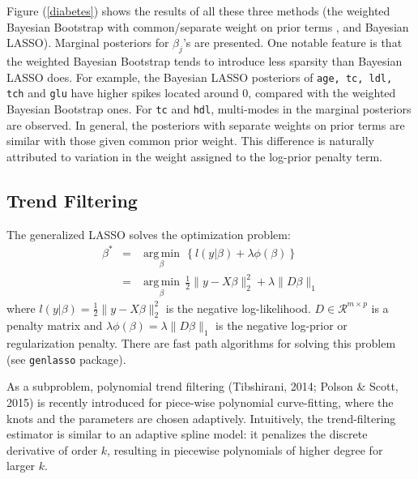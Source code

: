 \documentclass[12pt]{TD-CJS}
\newcommand{\R}{\mathcal{R}}
\DeclareMathOperator*{\argmin}{arg\,min}
\begin{document}
Figure (\ref{diabetes}) shows the results of all these three methods (the weighted Bayesian Bootstrap with common/separate  weight on prior terms , and Bayesian LASSO). Marginal posteriors for $\beta_j$'s are presented. One notable feature is that the weighted Bayesian Bootstrap tends to introduce less sparsity than Bayesian LASSO does. For example, the Bayesian LASSO posteriors of {\tt age, tc, ldl, tch} and {\tt glu} have higher spikes located around 0, compared with the weighted Bayesian Bootstrap ones. For {\tt tc} and {\tt hdl}, multi-modes in the marginal posteriors are observed. In general, the posteriors with 
separate weights on prior terms are similar with those given common prior weight. This difference is naturally attributed to variation in the weight assigned to the log-prior penalty term. 

\subsection{Trend Filtering}
The generalized LASSO solves the optimization problem:
\begin{eqnarray}
\beta^* &=& \underset{\beta}{\argmin} \, \left\{ l(y|\beta) + \lambda\phi(\beta)  \right\}\\
&=& \underset{\beta}{\argmin} \, \frac{1}{2}\|y - X\beta\|_2^2 + \lambda \|D\beta\|_1
\end{eqnarray}
where $ l(y|\beta) = \frac{1}{2}\|y - X\beta\|_2^2 $ is the negative log-likelihood. $D \in \R^{m\times p}$ is a penalty matrix and $ \lambda\phi(\beta) = \lambda \|D\beta\|_1$ is the negative log-prior or regularization penalty. There are fast path algorithms for solving this problem (see {\tt genlasso} package).

As a subproblem, polynomial trend filtering (Tibshirani, 2014; Polson \& Scott, 2015) is recently introduced for piece-wise polynomial curve-fitting, where the knots and the parameters are chosen adaptively. Intuitively, the trend-filtering estimator is similar to an adaptive spline model: it penalizes the discrete derivative of order $k$, resulting in piecewise polynomials of higher degree for larger $k$.
\end{document}
